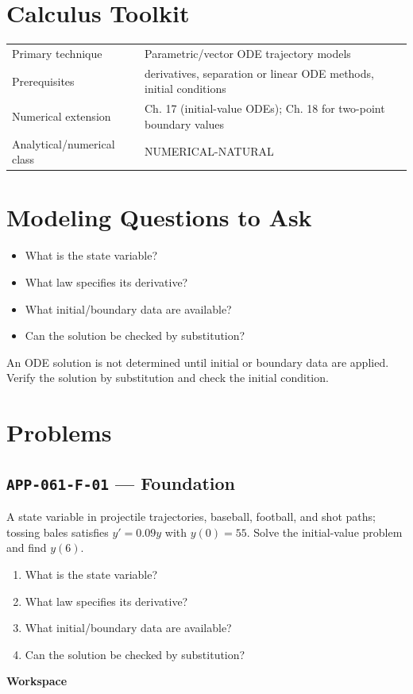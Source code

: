 \documentclass[11pt]{book}
\newcommand{\pid}[1]{\texttt{#1}}
\newcommand{\workspace}{\par\vspace{0.7in}\hrulefill\par\vspace{0.55in}\hrulefill\par}
\begin{document}
\section*{Calculus Toolkit}
\begin{tabularx}{\textwidth}{@{}lX@{}}\toprule
Primary technique & Parametric/vector ODE trajectory models \\
Prerequisites & derivatives, separation or linear ODE methods, initial conditions \\
Numerical extension & Ch. 17 (initial-value ODEs); Ch. 18 for two-point boundary values \\
Analytical/numerical class & NUMERICAL-NATURAL \\
\bottomrule\end{tabularx}
\section*{Modeling Questions to Ask}\begin{itemize}
\item What is the state variable?
\item What law specifies its derivative?
\item What initial/boundary data are available?
\item Can the solution be checked by substitution?
\end{itemize}
\begin{errorbox}An ODE solution is not determined until initial or boundary data are applied. Verify the solution by substitution and check the initial condition.\end{errorbox}
\section*{Problems}
\subsection*{\pid{APP-061-F-01} — Foundation}
\begin{problembox}
A state variable in projectile trajectories, baseball, football, and shot paths; tossing bales satisfies $y'=0.09y$ with $y(0)=55$. Solve the initial-value problem and find $y(6)$.
\end{problembox}
\begin{promptbox}\begin{enumerate}
\item What is the state variable?
\item What law specifies its derivative?
\item What initial/boundary data are available?
\item Can the solution be checked by substitution?
\end{enumerate}\end{promptbox}
\textbf{Workspace}\workspace
{}
\end{document}
